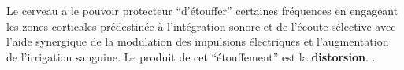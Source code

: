 Le cerveau a le pouvoir protecteur ``d'étouffer''
certaines fréquences en engageant les zones corticales prédestinée à 
l'intégration sonore et de l'écoute sélective avec l'aide synergique de la
modulation des impulsions électriques et l'augmentation de
l'irrigation sanguine\autocite [14] {auriol:cle}.
Le produit de cet ``étouffement'' est la
\textbf{distorsion}.
\autocite{tomatis:education}.

  



  




 




  

